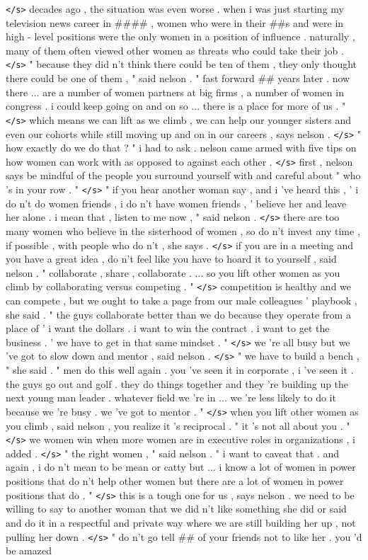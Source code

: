 \documentclass[12pt]{report}
\begin{document}
\begin{appendices}
\texttt{</s>} decades ago , the situation was even worse . when i was just starting my television news career in \#\#\#\# , women who were in their \#\#s and were in high - level positions were the only women in a position of influence . naturally , many of them often viewed other women as threats who could take their job . \texttt{</s>} " because they did n't think there could be ten of them , they only thought there could be one of them , " said nelson . " fast forward \#\# years later . now there ... are a number of women partners at big firms , a number of women in congress . i could keep going on and on so ... there is a place for more of us . " \texttt{</s>} which means we can lift as we climb , we can help our younger sisters and even our cohorts while still moving up and on in our careers , says nelson . \texttt{</s>} " how exactly do we do that ? " i had to ask . nelson came armed with five tips on how women can work with as opposed to against each other . \texttt{</s>} first , nelson says be mindful of the people you surround yourself with and careful about " who 's in your row . " \texttt{</s>} " if you hear another woman say , and i 've heard this , ' i do n't do women friends , i do n't have women friends , ' believe her and leave her alone . i mean that , listen to me now , " said nelson . \texttt{</s>} there are too many women who believe in the sisterhood of women , so do n't invest any time , if possible , with people who do n't , she says . \texttt{</s>} if you are in a meeting and you have a great idea , do n't feel like you have to hoard it to yourself , said nelson . " collaborate , share , collaborate . ... so you lift other women as you climb by collaborating versus competing . " \texttt{</s>} competition is healthy and we can compete , but we ought to take a page from our male colleagues ' playbook , she said . " the guys collaborate better than we do because they operate from a place of ' i want the dollars . i want to win the contract . i want to get the business . ' we have to get in that same mindset . " \texttt{</s>} we 're all busy but we 've got to slow down and mentor , said nelson . \texttt{</s>} " we have to build a bench , " she said . " men do this well again . you 've seen it in corporate , i 've seen it . the guys go out and golf . they do things together and they 're building up the next young man leader . whatever field we 're in ... we 're less likely to do it because we 're busy . we 've got to mentor . " \texttt{</s>} when you lift other women as you climb , said nelson , you realize it 's reciprocal . " it 's not all about you . " \texttt{</s>} we women win when more women are in executive roles in organizations , i added . \texttt{</s>} " the right women , " said nelson . " i want to caveat that . and again , i do n't mean to be mean or catty but ... i know a lot of women in power positions that do n't help other women but there are a lot of women in power positions that do . " \texttt{</s>} this is a tough one for us , says nelson . we need to be willing to say to another woman that we did n't like something she did or said and do it in a respectful and private way where we are still building her up , not pulling her down . \texttt{</s>} " do n't go tell \#\# of your friends not to like her . you 'd be amazed 
\end{appendices}
\end{document}
